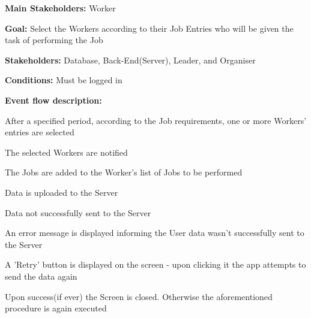 			\noindent {}
			\begin{packed_item}
				\item \textbf{Main Stakeholders:} Worker
				\item \textbf{Goal:} Select the Workers according to their Job Entries who will be given the task of performing the Job
				\item \textbf{Stakeholders: } Database, Back-End(Server), Leader, and Organiser
				\item \textbf{Conditions: } Must be logged in
				\item \textbf{Event flow description: }
				\begin{packed_enum}
					\item After a specified period, according to the Job requirements, one or more Workers' entries are selected
					\item The selected Workers are notified
					\item The Jobs are added to the Worker's list of Jobs to be performed
					\item Data is uploaded to the Server
				\end{packed_enum}
				
				\begin{packed_item}
					\item[4.a] Data not successfully sent to the Server
					\item[] \begin{packed_enum}
						\item An error message is displayed informing the User data wasn't successfully sent to the Server
						\item A 'Retry' button is displayed on the screen - upon clicking it the app attempts to send the data again
						\item Upon success(if ever) the Screen is closed. Otherwise the aforementioned procedure is again executed
					\end{packed_enum}
				\end{packed_item}
			\end{packed_item}
		
